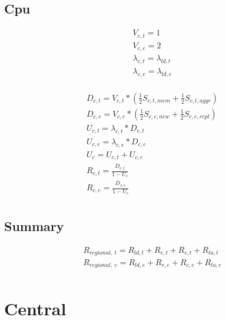 \documentclass[11pt]{article}
\begin{document}
\subsection{Cpu}

\begin{equation}
    \begin{array}{l}
        V_{c, t} = 1 \\
        V_{c, e} = 2 \\ %
        \lambda_{c, t} = \lambda_{ld, t} \\
        \lambda_{c, e} = \lambda_{ld, e} \\
    \end{array}
\end{equation}

\begin{equation}
    \begin{array}{l}
        D_{c, t} = V_{c, t} * (\frac{1}{2}S_{c, t, mem} + \frac{1}{2}S_{c, t, aggr}) \\ %
        D_{c, e} = V_{c, e} * (\frac{1}{2}S_{c, e, new} + \frac{1}{2}S_{c, e, repl}) \\
        U_{c, t} = \lambda_{c, t} * D_{c, t} \\
        U_{c, e} = \lambda_{c, e} * D_{c, e} \\
        U_{c} = U_{c, t} + U_{c, e} \\
        R_{c, t} = \frac{D_{c, t}}{1 - U_{c}} \\
        R_{c, e} = \frac{D_{c, e}}{1 - U_{c}} \\
    \end{array}
\end{equation}


\subsection{Summary}
\begin{equation}
    \begin{array}{l}
        R_{regional, \ t} = R_{ld, t} + R_{r, t} + R_{c, t} + R_{lu, t} \\
        R_{regional, \ e} = R_{ld, e} + R_{r, e} + R_{c, e} + R_{lu, e} \\
    \end{array}
\end{equation}

\section{Central}
\end{document}
